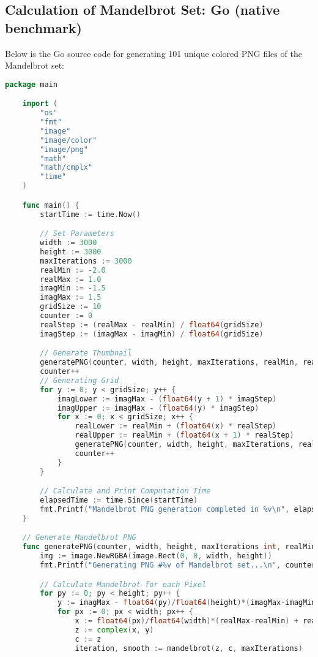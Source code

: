 \subsection{Calculation of Mandelbrot Set: Go (native benchmark)}
\label{app:code:mandelbrot3}
Below is the Go source code for generating 101 unique colored \ac{PNG} files of the Mandelbrot set:

\begin{lstlisting}[language=go, frame=tb, caption={Mandelbrot Set Calculation}]
    package main

    import (
        "os"
        "fmt"
        "image"
        "image/color"
        "image/png"
        "math"
        "math/cmplx"
        "time"
    )

    func main() {
        startTime := time.Now()

        // Set Parameters
        width := 3000
        height := 3000
        maxIterations := 3000
        realMin := -2.0
        realMax := 1.0
        imagMin := -1.5
        imagMax := 1.5
        gridSize := 10
        counter := 0
        realStep := (realMax - realMin) / float64(gridSize)
        imagStep := (imagMax - imagMin) / float64(gridSize) 

        // Generate Thumbnail
        generatePNG(counter, width, height, maxIterations, realMin, realMax, imagMin, imagMax)
        counter++
        // Generating Grid
        for y := 0; y < gridSize; y++ {
            imagLower := imagMax - (float64(y + 1) * imagStep)
            imagUpper := imagMax - (float64(y) * imagStep)
            for x := 0; x < gridSize; x++ {
                realLower := realMin + (float64(x) * realStep)
                realUpper := realMin + (float64(x + 1) * realStep)
                generatePNG(counter, width, height, maxIterations, realLower, realUpper, imagLower, imagUpper)
                counter++
            }   
        }

        // Calculate and Print Computation Time
        elapsedTime := time.Since(startTime)
        fmt.Printf("Mandelbrot PNG generation completed in %v\n", elapsedTime)
    }

    // Generate Mandelbrot PNG
    func generatePNG(counter, width, height, maxIterations int, realMin, realMax, imagMin, imagMax float64) {
        img := image.NewRGBA(image.Rect(0, 0, width, height))
        fmt.Printf("Generating PNG #%v of Mandelbrot set...\n", counter)

        // Calculate Mandelbrot for each Pixel
        for py := 0; py < height; py++ {
            y := imagMax - float64(py)/float64(height)*(imagMax-imagMin)
            for px := 0; px < width; px++ {
                x := float64(px)/float64(width)*(realMax-realMin) + realMin
                z := complex(x, y)
                c := z
                iteration, smooth := mandelbrot(z, c, maxIterations)


\end{lstlisting}
